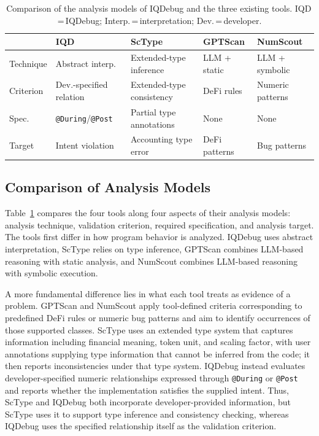 \documentclass[11pt,oneside]{report}
\theoremstyle{plain}
\theoremstyle{definition}
\theoremstyle{remark}
\begin{document}
\begin{table}[t]
\centering
\caption{Comparison of the analysis models of IQDebug and the three
existing tools. IQD\,=\,IQDebug; Interp.\,=\,interpretation;
Dev.\,=\,developer.}
\label{tab:eval:rq4:model}
\footnotesize
\begin{tabularx}{\linewidth}{@{} l >{\raggedright\arraybackslash}X
                                >{\raggedright\arraybackslash}X
                                >{\raggedright\arraybackslash}X
                                >{\raggedright\arraybackslash}X @{}}
\toprule
& \textbf{IQD} & \textbf{ScType} & \textbf{GPTScan} & \textbf{NumScout} \\
\midrule
Technique
& Abstract interp.
& Extended-type inference
& LLM + static
& LLM + symbolic \\

Criterion
& Dev.-specified relation
& Extended-type consistency
& DeFi rules
& Numeric patterns \\

Spec.
& \texttt{@During}/\texttt{@Post}
& Partial type annotations
& None
& None \\

Target
& Intent violation
& Accounting type error
& DeFi patterns
& Bug patterns \\
\bottomrule
\end{tabularx}
\end{table}

\subsection{Comparison of Analysis Models}\label{subsec:eval:rq4:model}

Table~\ref{tab:eval:rq4:model} compares the four tools along four aspects of their
analysis models: analysis technique, validation criterion, required
specification, and analysis target.
The tools first differ in how program behavior is analyzed. IQDebug uses
abstract interpretation, ScType relies on type inference, GPTScan combines
LLM-based reasoning with static analysis, and NumScout combines LLM-based
reasoning with symbolic execution.

A more fundamental difference lies in what each tool treats as evidence of a
problem. GPTScan and NumScout apply tool-defined criteria corresponding to
predefined DeFi rules or numeric bug patterns and aim to identify occurrences
of those supported classes. ScType uses an extended type system that captures
information including financial meaning, token unit, and scaling factor, with
user annotations supplying type information that cannot be inferred from the
code; it then reports inconsistencies under that type system. IQDebug
instead evaluates developer-specified numeric relationships expressed through
\texttt{@During} or \texttt{@Post} and reports whether the implementation
satisfies the supplied intent. Thus, ScType and IQDebug both incorporate
developer-provided information, but ScType uses it to support type inference
and consistency checking, whereas IQDebug uses the specified relationship
itself as the validation criterion.
\end{document}
